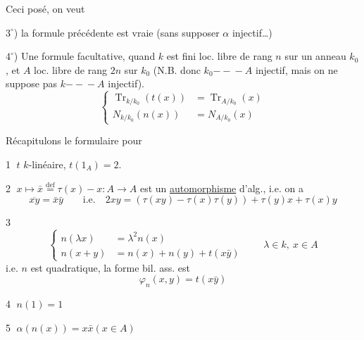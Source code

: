 Ceci posé, on veut

$3^\circ$) la formule précédente est vraie (sans supposer $\alpha$ injectif\ldots)

$4^\circ$) Une formule facultative, quand $k$ est fini loc. libre de rang  $n$ sur un anneau $k_0$, et  $A$ loc. libre de rang $2n$ sur $k_0$ (N.B. donc $k_0\mathrel{-\!\!-\!\!-}A$ injectif, mais on ne suppose pas $k\mathrel{-\!\!-\!\!-}A$ injectif).
\[
 \boxed{\left\{\begin{aligned}
 \operatorname{Tr}_{k/k_0}(t(x))&=\operatorname{Tr}_{A/k_0}(x)\\
 N_{k/k_0}(n(x))&=N_{A/k_0}(x)
 \end{aligned}\right.}
\]

Récapitulons le formulaire pour

\textcircled{1} $t$  $k$-linéaire, $\boxed{t(1_A)=2}$.

\textcircled{2} $x\longmapsto\bar x\overset{\mathrm{def}}{=}\tau(x)-x:A\longrightarrow A$
est un \uline{automorphisme} d'alg., i.e. on a
\[
 \boxed{\overline{xy}=\bar x\bar y}\qquad\text{i.e.}\quad
 2xy=(\tau(xy)-\tau(x)\tau(y))+\tau(y)x+\tau(x)y
\]

\textcircled{3}
\[
 \boxed{\left\{\begin{aligned}n(\lambda x)&=\lambda^2n(x)\\n(x+y)&=n(x)+n(y)+t(x\bar y)\end{aligned}\right.}
 \qquad\lambda\in k,\ x\in A
\]
i.e. $n$ est quadratique, la forme bil. ass. est 
\[
 \varphi_n(x,y)=t(x\bar y)
\]

\textcircled{4} $\boxed{n(1)=1}$

\textcircled{5} $\boxed{\alpha(n(x))=x\bar x}$\qquad$(x\in A)$

